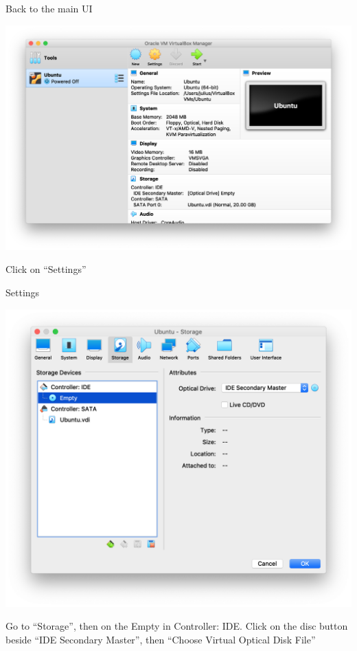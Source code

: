\documentclass[11pt]{beamer}
\begin{document}
\begin{frame}{Back to the main UI}
  \begin{center}
    \includegraphics[width=0.8\linewidth]{vb-main2}
  \end{center}
  Click on ``Settings''
\end{frame}

\begin{frame}{Settings}
  \begin{center}
    \includegraphics[width=0.8\linewidth]{vb-settings}
  \end{center}
  Go to ``Storage'', then on the Empty in Controller: IDE. Click on the disc button beside ``IDE Secondary Master'', then ``Choose Virtual Optical Disk File''
\end{frame}
\end{document}
